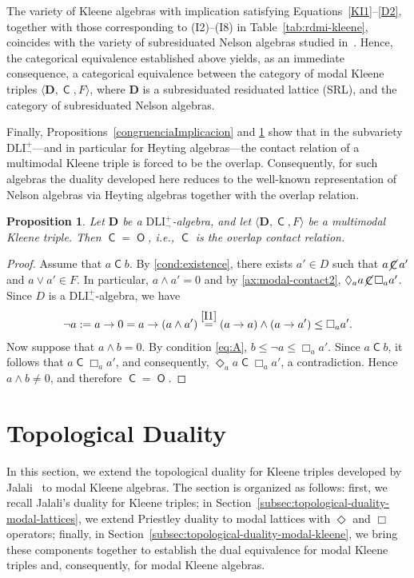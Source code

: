 \documentclass{article}
\newtheorem{proposition}[theorem]{Proposition}
\DeclareMathOperator{\con}{\mathsf{C}}
\DeclareMathOperator{\notcon}{\cancel{ \con}}
\DeclareMathOperator{\Overl}{\mathsf{O}}
\newcommand{\D}{\mathbf{D}}
\begin{document}
The variety of Kleene algebras with implication satisfying Equations~\eqref{KI1}--\eqref{D2}, together with those corresponding to (I2)--(I8) in Table~\ref{tab:rdmi-kleene}, coincides with the variety of subresiduated Nelson algebras studied in~\cite{noemi2025}. Hence, the categorical equivalence established above yields, as an immediate consequence, a categorical equivalence between the category of modal Kleene triples $\langle\D,\con,F\rangle$, where $\D$ is a subresiduated residuated lattice (SRL), and the category of subresiduated Nelson algebras.

Finally, Propositions~\ref{congruenciaImplicacion} and \ref{prop:DLIneg-forces-overlap} show that in the subvariety $\mathrm{DLI}_{\neg}^+$—and in particular for Heyting algebras—the contact relation of a multimodal Kleene triple is forced to be the overlap. Consequently, for such algebras the duality developed here reduces to the well-known representation of Nelson algebras via Heyting algebras together with the overlap relation. 

\begin{proposition}
\label{prop:DLIneg-forces-overlap}
Let $\D$ be a $\mathrm{DLI}_{\neg}^+$-algebra, and let $\langle\D,\con,F\rangle$ be a multimodal Kleene triple. Then $\con =\Overl$, i.e., $\con$ is the overlap contact relation.
\end{proposition}
\begin{proof}
Assume that $a\con b$. By \eqref{cond:existence}, there exists $a' \in D$ such that
$a\notcon a'$ and $a \vee a' \in F$. In particular, $a \wedge a' = 0$ and by \eqref{ax:modal-contact2}, $\Diamond_a a \notcon \Box_a a'$. Since $D$ is a $\mathrm{DLI}_{\neg}^+$-algebra, we have
\begin{align*}
    \neg a := a \to 0 = a \to (a \wedge a') \overset{\eqref{I1}}{=} (a \to a) \wedge (a \to a') \leq \Box_a a'.
\end{align*}
Now suppose that $a \wedge b = 0$. By condition \eqref{eq:A}, $b \leq \neg a \leq \Box_a a'$. Since $a\con b$, it follows that $a\con \Box_a a'$, and consequently, $\Diamond_a a \con \Box_a a'$, a contradiction. Hence $a\wedge b\neq 0$, and therefore $\con = \Overl$.
\end{proof}

\section{Topological Duality}
\label{sec:topological-duality}

In this section, we extend the topological duality for Kleene triples developed by Jalali~\cite{jalali} to modal Kleene algebras. The section is organized as follows: first, we recall Jalali's duality for Kleene triples; in Section~\ref{subsec:topological-duality-modal-lattices}, we extend Priestley duality to modal lattices with $\Diamond$ and $\Box$ operators; finally, in Section~\ref{subsec:topological-duality-modal-kleene}, we bring these components together to establish the dual equivalence for modal Kleene triples and, consequently, for modal Kleene algebras.
\end{document}

